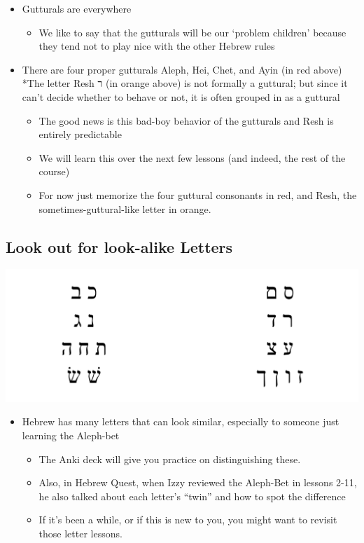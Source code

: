\documentclass[
]{turabian-researchpaper}
\providecommand{\tightlist}{%
  \setlength{\itemsep}{0pt}\setlength{\parskip}{0pt}}
\begin{document}
\begin{itemize}
\tightlist
\item
  Gutturals are everywhere

  \begin{itemize}
  \tightlist
  \item
    We like to say that the gutturals will be our `problem children' because they tend not to play nice with the other Hebrew rules
  \end{itemize}
\item
  There are four proper gutturals Aleph, Hei, Chet, and Ayin (in red above)
  *The letter Resh ר (in orange above) is not formally a guttural; but since it can't decide whether to behave or not, it is often grouped in as a guttural

  \begin{itemize}
  \tightlist
  \item
    The good news is this bad-boy behavior of the gutturals and Resh is entirely predictable
  \item
    We will learn this over the next few lessons (and indeed, the rest of the course)
  \item
    For now just memorize the four guttural consonants in red, and Resh, the sometimes-guttural-like letter in orange.
  \end{itemize}
\end{itemize}

\hypertarget{one_6}{%
\subsection{Look out for look-alike Letters}\label{one_6}}

\begin{center}\includegraphics[width=400pt]{images/lookalikes} \end{center}

\begin{itemize}
\tightlist
\item
  Hebrew has many letters that can look similar, especially to someone just learning the Aleph-bet

  \begin{itemize}
  \tightlist
  \item
    The Anki deck will give you practice on distinguishing these.
  \item
    Also, in Hebrew Quest, when Izzy reviewed the Aleph-Bet in lessons 2-11, he also talked about each letter's ``twin'' and how to spot the difference
  \item
    If it's been a while, or if this is new to you, you might want to revisit those letter lessons.
  \end{itemize}
\end{itemize}
\end{document}
